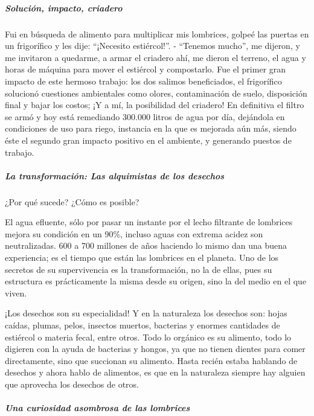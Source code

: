\documentclass[
]{article}
\begin{document}
\hypertarget{soluciuxf3n-impacto-criadero}{%
\subparagraph{Solución, impacto,
criadero}\label{soluciuxf3n-impacto-criadero}}

Fui en búsqueda de alimento para multiplicar mis lombrices, golpeé las
puertas en un frigorífico y les dije: ``¡Necesito estiércol!''. -
``Tenemos mucho'', me dijeron, y me invitaron a quedarme, a armar el
criadero ahí, me dieron el terreno, el agua y horas de máquina para
mover el estiércol y compostarlo. Fue el primer gran impacto de este
hermoso trabajo: los dos salimos beneficiados, el frigorífico solucionó
cuestiones ambientales como olores, contaminación de suelo, disposición
final y bajar los costos; ¡Y a mí, la posibilidad del criadero! En
definitiva el filtro se armó y hoy está remediando 300.000 litros de
agua por día, dejándola en condiciones de uso para riego, instancia en
la que es mejorada aún más, siendo éste el segundo gran impacto positivo
en el ambiente, y generando puestos de trabajo.

\hypertarget{la-transformaciuxf3n-las-alquimistas-de-los-desechos}{%
\subparagraph{La transformación: Las alquimistas de los
desechos}\label{la-transformaciuxf3n-las-alquimistas-de-los-desechos}}

¿Por qué sucede? ¿Cómo es posible?

El agua efluente, sólo por pasar un instante por el lecho filtrante de
lombrices mejora su condición en un 90\%, incluso aguas con extrema
acidez son neutralizadas. 600 a 700 millones de años haciendo lo mismo
dan una buena experiencia; es el tiempo que están las lombrices en el
planeta. Uno de los secretos de su supervivencia es la transformación,
no la de ellas, pues su estructura es prácticamente la misma desde su
origen, sino la del medio en el que viven.

¡Los desechos son su especialidad! Y en la naturaleza los desechos son:
hojas caídas, plumas, pelos, insectos muertos, bacterias y enormes
cantidades de estiércol o materia fecal, entre otros. Todo lo orgánico
es su alimento, todo lo digieren con la ayuda de bacterias y hongos, ya
que no tienen dientes para comer directamente, sino que succionan su
alimento. Hasta recién estaba hablando de desechos y ahora hablo de
alimentos, es que en la naturaleza siempre hay alguien que aprovecha los
desechos de otros.

\hypertarget{una-curiosidad-asombrosa-de-las-lombrices}{%
\subparagraph{Una curiosidad asombrosa de las
lombrices}\label{una-curiosidad-asombrosa-de-las-lombrices}}
\end{document}
